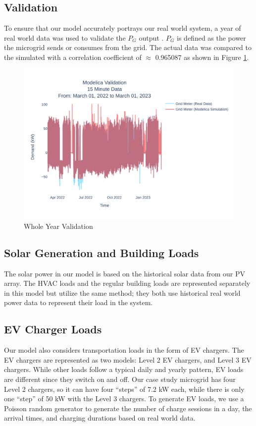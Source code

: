 \documentclass[conference]{IEEEtran}
\begin{document}
	\subsection{Validation}
		To ensure that our model accurately portrays our real world system, a year of real world data was used to validate the $P_G $ output . $P_G$ is defined as the power the microgrid sends or consumes from the grid.  The actual data was compared to the simulated  with a correlation coefficient of  $\approx$ 0.965087 as shown in Figure \ref{fig:ucr15minutedatamar012022tomar012023}. 
		\begin{figure}[H]
			\centering
			\includegraphics[width=1\linewidth]{Fig/ucr_15_Minute_Data_Mar_01_2022_to_Mar_01_2023}
			\caption{Whole Year Validation}
			\label{fig:ucr15minutedatamar012022tomar012023}
		\end{figure}
		
    \subsection{Solar Generation and Building Loads}
    	The solar power in our model is based on the historical solar data from our PV array. The HVAC loads and the regular building loads are represented separately in this model but utilize the same method; they both use historical real world power data to represent their load in the system. 
    \subsection{EV Charger Loads }
   		Our model also considers transportation loads in the form of EV chargers. The EV chargers are represented as two models: Level 2 EV chargers, and Level 3 EV chargers. While other loads follow a typical daily and yearly pattern, EV loads are different since they switch on and off. Our case study microgrid has four Level 2 chargers, so it can have four ``steps'' of 7.2 kW each, while there is only one ``step'' of 50 kW with the Level 3 chargers. To generate EV loads, we use a Poisson random generator to generate the number of charge sessions in a day, the arrival times, and charging durations based on real world data. \\
   		
\end{document}
